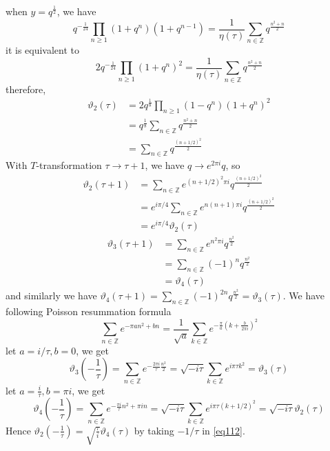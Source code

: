 when $y = q^{\frac{1}{2}}$, we have 
\begin{equation}
	q^{-\frac{1}{24}} \prod_{n \geq 1} (1+ q^{n})(1+ q^{n-1}) = \frac{1}{\eta(\tau)} \sum_{n\in \mathbb{Z}}  q^{\frac{n^2+n}{2}}
\end{equation}
it is equivalent to 
\begin{equation}
	2q^{-\frac{1}{24}} \prod_{n \geq 1} (1+ q^{n})^2 = \frac{1}{\eta(\tau)} \sum_{n\in \mathbb{Z}}  q^{\frac{n^2+n}{2}}
\end{equation}
therefore,
\begin{equation}
	\begin{split}
	\vartheta_2(\tau) & = 2q^{\frac{1}{8}} \prod_{n \geq 1} (1- q^n)(1+q^n)^2 \\
	& = q^{\frac{1}{8}} \sum_{n\in \mathbb{Z}} q^{\frac{n^2+n}{2}}\\
	& = \sum_{n\in \mathbb{Z}} q^{\frac{(n+1/2)^2}{2}}
	\end{split}
\end{equation}
With $T$-transformation $\tau \to \tau +1$, we have $q \to e^{2\pi i} q$, so
\begin{equation}
	\begin{split}
	\vartheta_2(\tau+1) & = \sum_{n\in \mathbb{Z}} e^{(n+1/2)^2 \pi i} q^{\frac{(n+1/2)^2}{2}}\\
	& = e^{i\pi/4} \sum_{n \in \mathbb{Z}} e^{n(n+1)\pi i} q^{\frac{(n+1/2)^2}{2}}\\
	& = e^{i\pi/4}  \vartheta_2(\tau)
	\end{split}
\end{equation}
\begin{equation}
	\begin{split}
	\vartheta_3(\tau+1) & = \sum_{n \in \mathbb{Z}} e^{n^2 \pi i}q^{\frac{n^2}{2}}\\
	& = \sum_{n \in \mathbb{Z}} (-1)^n q^{\frac{n^2}{2}} \\
	&= \vartheta_4(\tau)
	\end{split}
\end{equation}
and similarly we have $\vartheta_4(\tau +1) = \sum_{n \in \mathbb{Z}} (-1)^{2n} q^{\frac{n^2}{2}} = \vartheta_3(\tau)$. 
We have following Poisson resummation formula
\begin{equation}
	\sum_{n \in \mathbb{Z}} e^{- \pi an^2 +bn} = \frac{1}{\sqrt{a}} \sum_{k \in \mathbb{Z}} e^{- \frac{\pi}{a}\left( k + \frac{b}{2 \pi i}\right)^2 }
\end{equation}
let $a = i /\tau, b=0$, we get
\begin{equation}
\vartheta_3(- \frac{1}{\tau}) =\sum_{n \in \mathbb{Z}} e^{-\frac{2\pi i }{\tau} \frac{n^2}{2}} = \sqrt{-i \tau} \sum_{k \in \mathbb{Z}} e^{i \pi \tau k^2} = \vartheta_3(\tau)
\end{equation}
let $ a = \frac{i}{\tau}, b= \pi i$, we get 
\begin{equation}
\label{eq112}
	\vartheta_4(-\frac{1}{\tau}) = \sum_{n \in \mathbb{Z}} e^{-\frac{\pi i}{\tau} n^2 + \pi i n} = \sqrt{-i \tau} \sum_{k \in \mathbb{Z}} e^{i \pi \tau (k +1/2)^2} = \sqrt{-i \tau} \vartheta_2(\tau)
\end{equation}
Hence $\vartheta_2(-\frac{1}{\tau}) = \sqrt{\frac{\tau}{i}} \vartheta_4(\tau)$ by taking $-1/\tau$ in \ref{eq112}.
